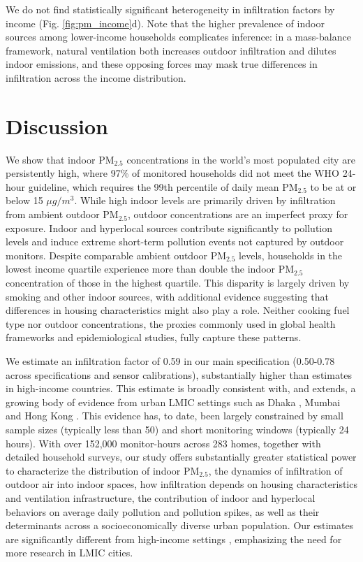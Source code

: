 \documentclass[9pt,twocolumn,twoside]{pnas-new}
\begin{document}
We do not find statistically significant heterogeneity in infiltration factors by income (Fig. \ref{fig:pm_income}d). Note that the higher prevalence of indoor sources among lower-income households complicates inference: in a mass-balance framework, natural ventilation both increases outdoor infiltration and dilutes indoor emissions, and these opposing forces may mask true differences in infiltration across the income distribution.

\section{Discussion}


We show that indoor PM$_{2.5}$ concentrations in the world's most populated city are persistently high, where 97\% of monitored households did not meet the WHO 24-hour guideline, which requires the 99th percentile of daily mean PM$_{2.5}$ to be at or below 15 $\mu g/m^3$. While high indoor levels are primarily driven by infiltration from ambient outdoor PM$_{2.5}$, outdoor concentrations are an imperfect proxy for exposure. Indoor and hyperlocal sources contribute significantly to pollution levels and induce extreme short-term pollution events not captured by outdoor monitors. Despite comparable ambient outdoor PM$_{2.5}$ levels, households in the lowest income quartile experience more than double the indoor PM$_{2.5}$ concentration of those in the highest quartile. This disparity is largely driven by smoking and other indoor sources, with additional evidence suggesting that differences in housing characteristics might also play a role. Neither cooking fuel type nor outdoor concentrations, the proxies commonly used in global health frameworks and epidemiological studies, fully capture these patterns.

We estimate an infiltration factor of 0.59 in our main specification (0.50-0.78 across specifications and sensor calibrations), substantially higher than estimates in high-income countries.
This estimate is broadly consistent with, and extends, a growing body of evidence from urban LMIC settings such as Dhaka \citep{Sahaetal2025}, Mumbai \citep{Anandetal2022} and Hong Kong \citep{Hossainetal2021}. This evidence has, to date, been largely constrained by small sample sizes (typically less than 50) and short monitoring windows (typically 24 hours). 
With over 152,000 monitor-hours across 283 homes, together with detailed household surveys, our study offers substantially greater statistical power to characterize the distribution of indoor PM$_{2.5}$, the dynamics of infiltration of outdoor air into indoor spaces, how infiltration depends on housing characteristics and ventilation infrastructure, the contribution of indoor and hyperlocal behaviors on average daily pollution and pollution spikes, as well as their determinants across a socioeconomically diverse urban population. Our estimates are significantly different from high-income settings \citep{krebs_using_2021, lunderberg_assessing_2023, burke_exposures_2022}, emphasizing the need for more research in LMIC cities.
\end{document}
